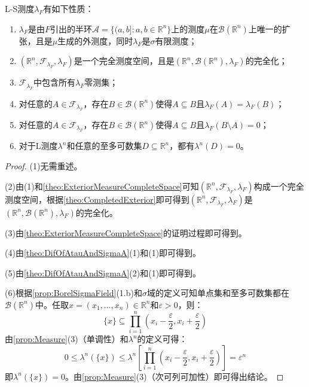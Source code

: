 \begin{property}\label{prop:LSMeasure}
	L-S测度$\lambda_F$有如下性质：
	\begin{enumerate}
		\item $\lambda_F$是由$F$引出的半环$\mathscr{A}=\{(a,b]:a,b\in\mathbb{R}^{n}\}$上的测度$\mu$在$\mathcal{B}(\mathbb{R}^{n})$上唯一的扩张，且是$\mu$生成的外测度，同时$\lambda_F$是$\sigma$有限测度；
		\item $(\mathbb{R}^{n},\mathscr{F}_{\lambda_F},\lambda_F)$是一个完全测度空间，且是$(\mathbb{R}^{n},\mathcal{B}(\mathbb{R}^{n}),\lambda_F)$的完全化；
		\item $\mathscr{F}_{\lambda_F}$中包含所有$\lambda_F$零测集；
		\item 对任意的$A\in\mathscr{F}_{\lambda_F}$，存在$B\in\mathcal{B}(\mathbb{R}^{n})$使得$A\subseteq B$且$\lambda_F(A)=\lambda_F(B)$；
		\item 对任意的$A\in\mathscr{F}_{\lambda_F}$，存在$B\in\mathcal{B}(\mathbb{R}^{n})$使得$A\subseteq B$且$\lambda_F(B\setminus A)=0$；
		\item 对于L测度$\lambda^n$和任意的至多可数集$D\subseteq\mathbb{R}^{n}$，都有$\lambda^n(D)=0$。
	\end{enumerate}
\end{property}
\begin{proof}
	(1)无需重述。\par
	(2)由(1)和\cref{theo:ExteriorMeasureCompleteSpace}可知$(\mathbb{R}^{n},\mathscr{F}_{\lambda_F},\lambda_F)$构成一个完全测度空间，根据\cref{theo:CompletedExterior}即可得到$(\mathbb{R}^{n},\mathscr{F}_{\lambda_F},\lambda_F)$是$(\mathbb{R}^{n},\mathcal{B}(\mathbb{R}^{n}),\lambda_F)$的完全化。\par
	(3)由\cref{theo:ExteriorMeasureCompleteSpace}的证明过程即可得到。\par
	(4)由\cref{theo:DifOfAtauAndSigmaA}(1)和(1)即可得到。\par
	(5)由\cref{theo:DifOfAtauAndSigmaA}(2)和(1)即可得到。\par
	(6)根据\cref{prop:BorelSigmaField}(1.b)和$\sigma$域的定义可知单点集和至多可数集都在$\mathcal{B}(\mathbb{R}^{n})$中。任取$x=(x_1,\ldots,x_n)\in\mathbb{R}^{n}$和$\varepsilon>0$，则：
	\begin{equation*}
		\{x\}\subseteq\prod_{i=1}^{n}\left(x_i-\frac{\varepsilon}{2},x_i+\frac{\varepsilon}{2}\right)
	\end{equation*}
	由\cref{prop:Measure}(3)（单调性）和$\lambda^n$的定义可得：
	\begin{equation*}
		0\leqslant\lambda^n(\{x\})\leqslant\lambda^n\left[\prod_{i=1}^{n}\left(x_i-\frac{\varepsilon}{2},x_i+\frac{\varepsilon}{2}\right)\right]=\varepsilon^n
	\end{equation*}
	即$\lambda^n(\{x\})=0$。由\cref{prop:Measure}(3)（次可列可加性）即可得出结论。
\end{proof}

